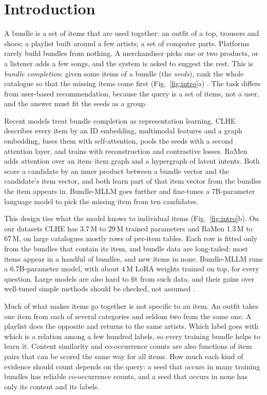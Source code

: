 \documentclass[runningheads]{llncs}
\begin{document}
\section{Introduction}

A bundle is a set of items that are used together: an outfit of a top, trousers and shoes; a playlist built around a
few artists; a set of computer parts. Platforms rarely build bundles from nothing. A merchandiser picks one or two
products, or a listener adds a few songs, and the system is asked to suggest the rest. This is \emph{bundle
completion}: given some items of a bundle (the \emph{seeds}), rank the whole catalogue so that the missing items come
first (Fig.~\ref{fig:intro}a) \cite{clhe,ramen}. The task differs from user-based recommendation, because the query
is a set of items, not a user, and the answer must fit the seeds as a group.

Recent models treat bundle completion as representation learning. CLHE \cite{clhe} describes every item by an ID
embedding, multimodal features and a graph embedding, fuses them with self-attention, pools the seeds with a second
attention layer, and trains with reconstruction and contrastive losses. RaMen \cite{ramen} adds attention over an
item--item graph and a hypergraph of latent intents. Both score a candidate by an inner product between a bundle
vector and the candidate's item vector, and both learn part of that item vector from the bundles the item appears in.
Bundle-MLLM \cite{bundlemllm} goes further and fine-tunes a 7B-parameter language model to pick the missing item from
ten candidates.

This design ties what the model knows to individual items (Fig.~\ref{fig:intro}b). On our datasets CLHE has 3.7\,M
to 29\,M trained parameters and RaMen 1.3\,M to 67\,M, on large catalogues mostly rows of per-item tables. Each row is fitted only from
the bundles that contain its item, and bundle data are long-tailed: most items appear in a handful of bundles, and new
items in none. Bundle-MLLM runs a 6.7B-parameter model, with about 4\,M LoRA weights trained on top, for every
question. Large models are also hard to fit from such data, and their gains over well-tuned simple methods
should be checked, not assumed \cite{dacrema}.

Much of what makes items go together is not specific to an item. An outfit takes one item from each of several
categories and seldom two from the same one. A playlist does the opposite and returns to the same artists. Which label
goes with which is a relation among a few hundred labels, so every training bundle helps to learn it. Content
similarity and co-occurrence counts are also functions of item pairs that can be scored the same way for all items.
How much each kind of evidence should count depends on the query: a seed that occurs in many training bundles has
reliable co-occurrence counts, and a seed that occurs in none has only its content and its labels.
\end{document}
